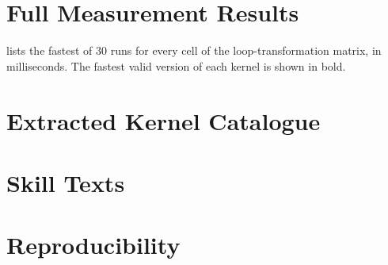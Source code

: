 \chapter{Full Measurement Results}
\label{app:results}

 lists the fastest of 30 runs for every cell of the loop-transformation
matrix, in milliseconds. The fastest valid version of each kernel is shown in bold.

\begin{table}[p]
  \centering
  \scriptsize
  \setlength{\tabcolsep}{4.5pt}
  
  \caption{The loop-transformation matrix: fastest of 30 runs in milliseconds (preset M,
    \texttt{float64}, one core of a GH200). Bold: fastest valid version. ---: version does not
    exist. $^\ddagger$: wrong result; shown but not used. $^\dagger$: validation not meaningful
    at this size (). $^\S$: unreliable GCC times
    ().}
  \label{tab:llr40-matrix}
\end{table}

\chapter{Extracted Kernel Catalogue}
\label{app:extracted}

\chapter{Skill Texts}
\label{app:skills}

\chapter{Reproducibility}
\label{app:reproduce}
